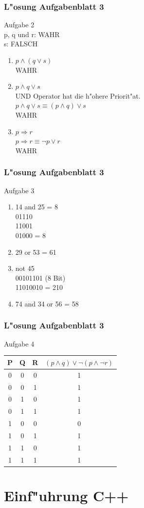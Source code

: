 \documentclass{beamer}
\begin{document}
\frame
{
	\frametitle{L"osung Aufgabenblatt 3}
	Aufgabe 2\\
	p, q und r: WAHR\\
	s: FALSCH\\
	\begin{enumerate}
	\item $p \land (q \lor s)$\\
	WAHR
	\item $p \land q \lor s$\\
	UND Operator hat die h"ohere Priorit"at.\\
	$p \land q \lor s \equiv (p \land q) \lor s$\\
	WAHR
	\item $p \Rightarrow r$\\
	$p \Rightarrow r \equiv \lnot p \lor r$\\
	WAHR
	\end{enumerate}
}

\frame
{
	\frametitle{L"osung Aufgabenblatt 3}
	Aufgabe 3\\
	\begin{enumerate}
	\item 14 and 25 = 8\\
	01110\\
	11001\\
	01000 = 8
	\item 29 or 53 = 61
	\item not 45\\
	00101101 (8 Bit)\\
	11010010 = 210
	\item 74 and 34 or 56 = 58
	\end{enumerate}
}

\frame
{
	\frametitle{L"osung Aufgabenblatt 3}
	Aufgabe 4\\
	\begin{tabular}{c|c|c|c}
	P & Q & R & $(p \land q) \lor \lnot(p \land \lnot r)$ \\
	\hline
	0 & 0 & 0 & 1\\
	0 & 0 & 1 & 1\\
	0 & 1 & 0 & 1\\
	0 & 1 & 1 & 1\\
	1 & 0 & 0 & 0\\
	1 & 0 & 1 & 1\\
	1 & 1 & 0 & 1\\
	1 & 1 & 1 & 1\\
	\end{tabular}
}

\section{Einf"uhrung C++}
\end{document}
